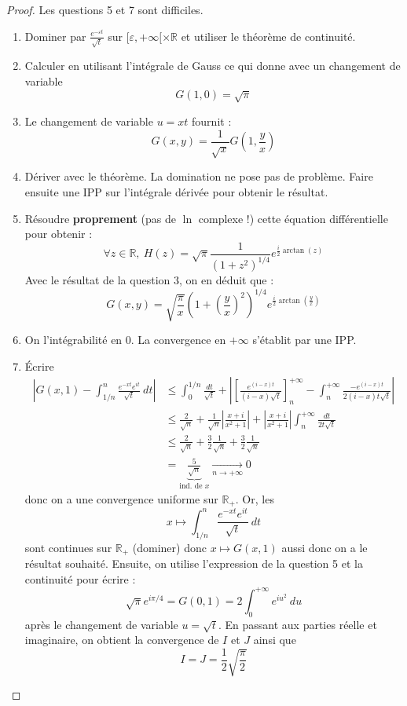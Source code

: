 \documentclass[french,a4paper]{article}
\newcommand{\R}{\mathbb{R}}
\theoremstyle{plain}
\theoremstyle{definition}
\theoremstyle{remark}
\begin{document}
\begin{proof}
	Les questions 5 et 7 sont difficiles.
	\begin{enumerate}
		\item  Dominer par $\displaystyle\frac{e^{-\varepsilon t}}{\sqrt{t}}$ sur $[\varepsilon,+\infty[\times\R$ et utiliser le théorème de continuité.
		\item Calculer en utilisant l'intégrale de Gauss ce qui donne avec un changement de variable $$G(1,0)=\sqrt{\pi}$$
		\item Le changement de variable $u=xt$ fournit : $$G(x,y)=\frac{1}{\sqrt{x}}G\left(1,\frac{y}{x}\right)$$
		\item Dériver avec le théorème. La domination ne pose pas de problème. Faire ensuite une IPP sur l'intégrale dérivée pour obtenir le résultat.
		\item Résoudre \textbf{proprement} (pas de $\ln$ complexe !) cette équation différentielle pour obtenir : $$\forall z\in\R,\ H(z)=\sqrt{\pi}\frac{1}{\left(1+z^2\right)^{1/4}}e^{\frac{i}{2}\arctan(z)}$$
		Avec le résultat de la question 3, on en déduit que : $$G(x,y)=\sqrt{\frac{\pi}{x}}{\left(1+\left(\frac{y}{x}\right)^2\right)^{1/4}}e^{\frac{i}{2}\arctan\left(\frac{y}{x}\right)}$$
		\item On l'intégrabilité en $0$. La convergence en $+\infty$ s'établit par une IPP.
		\item Écrire
		\begin{align*}
			\left\lvert G(x,1)-\int_{1/n}^{n}\frac{e^{-xt}e^{it}}{\sqrt{t}}\ dt\right\rvert&\leqslant\int_{0}^{1/n}\frac{dt}{\sqrt{t}}+\left\lvert\left[\frac{e^{(i-x)t}}{(i-x)\sqrt{t}}\right]_n^{+\infty} -\int_{n}^{+\infty}\frac{-e^{(i-x)t}}{2(i-x)t\sqrt{t}}\right\rvert \\
			&\leqslant \frac{2}{\sqrt{n}}+\frac{1}{\sqrt{n}}\left\lvert\frac{x+i}{x^2+1}\right\rvert+\left\lvert\frac{x+i}{x^2+1}\right\rvert\int_{n}^{+\infty}\frac{dt}{2t\sqrt{t}}\\
			&\leqslant\frac{2}{\sqrt{n}}+\frac32\frac{1}{\sqrt{n}}+\frac32\frac{1}{\sqrt{n}}\\
			&=\underbrace{\frac{5}{\sqrt{n}}}_{\text{ind. de }x}\xrightarrow[n\to+\infty]{}0
		\end{align*} donc on a une convergence uniforme sur $\R_+$. Or, les $$x\mapsto \int_{1/n}^{n}\frac{e^{-xt}e^{it}}{\sqrt{t}}\ dt$$ sont continues sur $\R_+$ (dominer) donc $x\mapsto G(x,1)$ aussi donc on a le résultat souhaité. Ensuite, on utilise l'expression de la question 5 et la continuité pour écrire : $$\sqrt{\pi}e^{i\pi/4}=G(0,1)=2\int_{0}^{+\infty}e^{iu^2}\ du$$ après le changement de variable $u=\sqrt{t}$. En passant aux parties réelle et imaginaire, on obtient la convergence de $I$ et $J$ ainsi que $$I=J=\frac{1}{2}\sqrt{\frac{\pi}{2}}$$
	\end{enumerate}
\end{proof}
\end{document}
